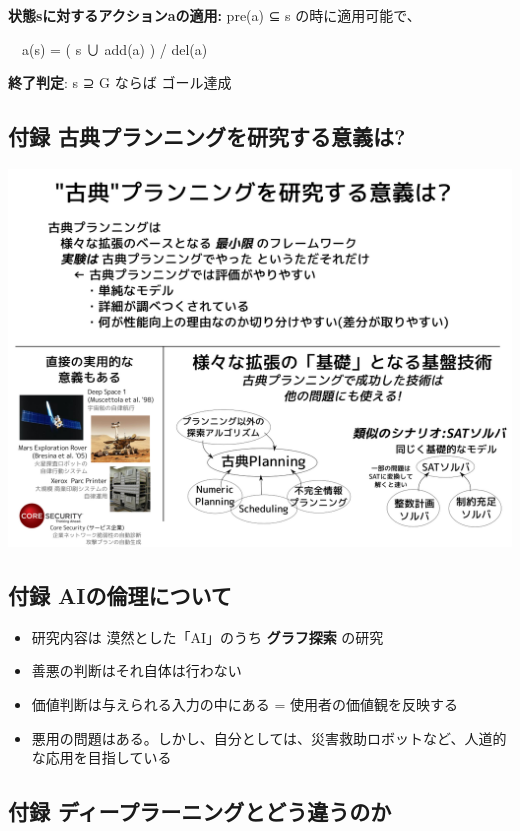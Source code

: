 \textbf{状態sに対するアクションaの適用:} pre(a) ⊆ s の時に適用可能で、

　a(s) = ( s ∪ add(a) ) / del(a)

\textbf{終了判定}: s ⊇ G ならば ゴール達成

\subsection{付録 古典プランニングを研究する意義は?}
\label{sec-5-6}

\includegraphics{img/classical-meaning.png}

\subsection{付録 AIの倫理について}
\label{sec-5-7}

\begin{itemize}
\item 研究内容は 漠然とした「AI」のうち \textbf{グラフ探索} の研究
\item 善悪の判断はそれ自体は行わない
\item 価値判断は与えられる入力の中にある = 使用者の価値観を反映する
\item 悪用の問題はある。しかし、自分としては、災害救助ロボットなど、人道的な応用を目指している
\end{itemize}

\subsection{付録 ディープラーニングとどう違うのか}
\label{sec-5-8}

